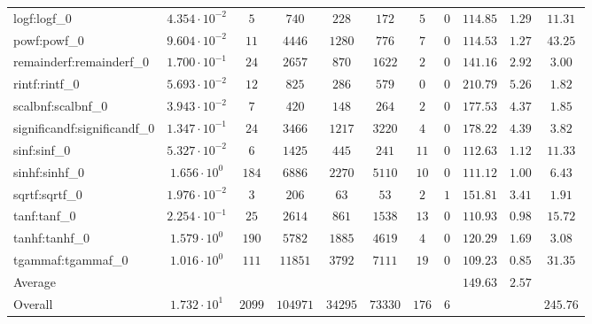 \begin{tabular}{|l|c|c|c|c|c|c|c|c|c|c|}
logf:logf\_0                 & $ 4.354 \cdot 10^{-2} $ & $ 5      $ & $ 740    $ & $ 228   $ & $ 172   $ & $ 5   $ & $ 0 $ & $ 114.85      $ & $ 1.29    $ & $ 11.31   $ \\
powf:powf\_0                 & $ 9.604 \cdot 10^{-2} $ & $ 11     $ & $ 4446   $ & $ 1280  $ & $ 776   $ & $ 7   $ & $ 0 $ & $ 114.53      $ & $ 1.27    $ & $ 43.25   $ \\
remainderf:remainderf\_0     & $ 1.700 \cdot 10^{-1} $ & $ 24     $ & $ 2657   $ & $ 870   $ & $ 1622  $ & $ 2   $ & $ 0 $ & $ 141.16      $ & $ 2.92    $ & $ 3.00    $ \\
rintf:rintf\_0               & $ 5.693 \cdot 10^{-2} $ & $ 12     $ & $ 825    $ & $ 286   $ & $ 579   $ & $ 0   $ & $ 0 $ & $ 210.79      $ & $ 5.26    $ & $ 1.82    $ \\
scalbnf:scalbnf\_0           & $ 3.943 \cdot 10^{-2} $ & $ 7      $ & $ 420    $ & $ 148   $ & $ 264   $ & $ 2   $ & $ 0 $ & $ 177.53      $ & $ 4.37    $ & $ 1.85    $ \\
significandf:significandf\_0 & $ 1.347 \cdot 10^{-1} $ & $ 24     $ & $ 3466   $ & $ 1217  $ & $ 3220  $ & $ 4   $ & $ 0 $ & $ 178.22      $ & $ 4.39    $ & $ 3.82    $ \\
sinf:sinf\_0                 & $ 5.327 \cdot 10^{-2} $ & $ 6      $ & $ 1425   $ & $ 445   $ & $ 241   $ & $ 11  $ & $ 0 $ & $ 112.63      $ & $ 1.12    $ & $ 11.33   $ \\
sinhf:sinhf\_0               & $ 1.656 \cdot 10^{0}  $ & $ 184    $ & $ 6886   $ & $ 2270  $ & $ 5110  $ & $ 10  $ & $ 0 $ & $ 111.12      $ & $ 1.00    $ & $ 6.43    $ \\
sqrtf:sqrtf\_0               & $ 1.976 \cdot 10^{-2} $ & $ 3      $ & $ 206    $ & $ 63    $ & $ 53    $ & $ 2   $ & $ 1 $ & $ 151.81      $ & $ 3.41    $ & $ 1.91    $ \\
tanf:tanf\_0                 & $ 2.254 \cdot 10^{-1} $ & $ 25     $ & $ 2614   $ & $ 861   $ & $ 1538  $ & $ 13  $ & $ 0 $ & $ 110.93      $ & $ 0.98    $ & $ 15.72   $ \\
tanhf:tanhf\_0               & $ 1.579 \cdot 10^{0}  $ & $ 190    $ & $ 5782   $ & $ 1885  $ & $ 4619  $ & $ 4   $ & $ 0 $ & $ 120.29      $ & $ 1.69    $ & $ 3.08    $ \\
tgammaf:tgammaf\_0           & $ 1.016 \cdot 10^{0}  $ & $ 111    $ & $ 11851  $ & $ 3792  $ & $ 7111  $ & $ 19  $ & $ 0 $ & $ 109.23      $ & $ 0.85    $ & $ 31.35   $ \\
\hline
Average                      & $                     $ & $        $ & $        $ & $       $ & $       $ & $     $ & $   $ & $ 149.63      $ & $ 2.57    $ & $         $ \\
\hline
Overall                      & $ 1.732 \cdot 10^{1}  $ & $ 2099   $ & $ 104971 $ & $ 34295 $ & $ 73330 $ & $ 176 $ & $ 6 $ & $             $ & $         $ & $ 245.76  $ \\
\hline
\end{tabular}
